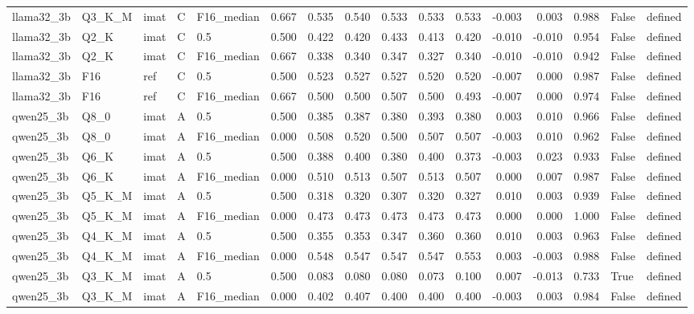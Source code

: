 \begin{tabular}{lllllrrrrrrrrrll}
llama32\_3b & Q3\_K\_M & imat & C & F16\_median & 0.667 & 0.535 & 0.540 & 0.533 & 0.533 & 0.533 & -0.003 & 0.003 & 0.988 & False & defined \\
llama32\_3b & Q2\_K & imat & C & 0.5 & 0.500 & 0.422 & 0.420 & 0.433 & 0.413 & 0.420 & -0.010 & -0.010 & 0.954 & False & defined \\
llama32\_3b & Q2\_K & imat & C & F16\_median & 0.667 & 0.338 & 0.340 & 0.347 & 0.327 & 0.340 & -0.010 & -0.010 & 0.942 & False & defined \\
llama32\_3b & F16 & ref & C & 0.5 & 0.500 & 0.523 & 0.527 & 0.527 & 0.520 & 0.520 & -0.007 & 0.000 & 0.987 & False & defined \\
llama32\_3b & F16 & ref & C & F16\_median & 0.667 & 0.500 & 0.500 & 0.507 & 0.500 & 0.493 & -0.007 & 0.000 & 0.974 & False & defined \\
qwen25\_3b & Q8\_0 & imat & A & 0.5 & 0.500 & 0.385 & 0.387 & 0.380 & 0.393 & 0.380 & 0.003 & 0.010 & 0.966 & False & defined \\
qwen25\_3b & Q8\_0 & imat & A & F16\_median & 0.000 & 0.508 & 0.520 & 0.500 & 0.507 & 0.507 & -0.003 & 0.010 & 0.962 & False & defined \\
qwen25\_3b & Q6\_K & imat & A & 0.5 & 0.500 & 0.388 & 0.400 & 0.380 & 0.400 & 0.373 & -0.003 & 0.023 & 0.933 & False & defined \\
qwen25\_3b & Q6\_K & imat & A & F16\_median & 0.000 & 0.510 & 0.513 & 0.507 & 0.513 & 0.507 & 0.000 & 0.007 & 0.987 & False & defined \\
qwen25\_3b & Q5\_K\_M & imat & A & 0.5 & 0.500 & 0.318 & 0.320 & 0.307 & 0.320 & 0.327 & 0.010 & 0.003 & 0.939 & False & defined \\
qwen25\_3b & Q5\_K\_M & imat & A & F16\_median & 0.000 & 0.473 & 0.473 & 0.473 & 0.473 & 0.473 & 0.000 & 0.000 & 1.000 & False & defined \\
qwen25\_3b & Q4\_K\_M & imat & A & 0.5 & 0.500 & 0.355 & 0.353 & 0.347 & 0.360 & 0.360 & 0.010 & 0.003 & 0.963 & False & defined \\
qwen25\_3b & Q4\_K\_M & imat & A & F16\_median & 0.000 & 0.548 & 0.547 & 0.547 & 0.547 & 0.553 & 0.003 & -0.003 & 0.988 & False & defined \\
qwen25\_3b & Q3\_K\_M & imat & A & 0.5 & 0.500 & 0.083 & 0.080 & 0.080 & 0.073 & 0.100 & 0.007 & -0.013 & 0.733 & True & defined \\
qwen25\_3b & Q3\_K\_M & imat & A & F16\_median & 0.000 & 0.402 & 0.407 & 0.400 & 0.400 & 0.400 & -0.003 & 0.003 & 0.984 & False & defined \\

\end{tabular}
